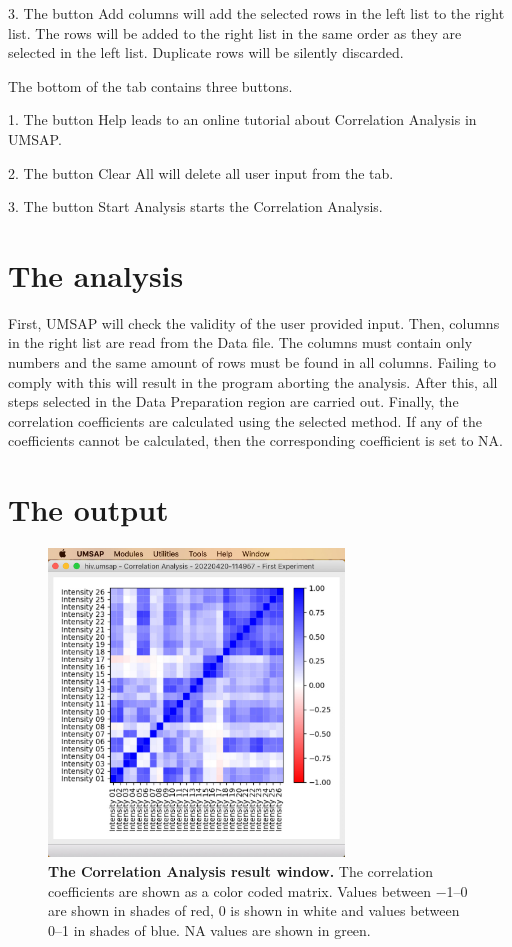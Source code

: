 \num{3}. The button Add columns will add the selected rows in the left list to
the right list. The rows will be added to the right list in the same order as
they are selected in the left list. Duplicate rows will be silently discarded.

The bottom of the tab contains three buttons.

\num{1}. The button Help leads to an online tutorial about Correlation Analysis in
UMSAP.

\num{2}. The button Clear All will delete all user input from the tab.

\num{3}. The button Start Analysis starts the Correlation Analysis.

\section{The analysis}

First, UMSAP will check the validity of the user provided input. Then, columns in
the right list are read from the Data file. The columns must contain only numbers
and the same amount of rows must be found in all columns. Failing to comply with
this will result in the program aborting the analysis. After this, all steps selected
in the Data Preparation region are carried out. Finally, the correlation coefficients
are calculated using the selected method. If any of the coefficients cannot be calculated,
then the corresponding coefficient is set to NA.

\section{The output}

\begin{figure}[h]
    \centering
    \includegraphics[width=0.7\textwidth]{./IMAGES/UTIL-CORR-WINDOW/util-corr-res.jpg}
    \caption[The Correlation Analysis result window]{\textbf{The Correlation Analysis
    result window.} The correlation coefficients are shown as a color coded matrix.
    Values between \numrange{-1}{0} are shown in shades of red, \num{0} is shown in
    white and values between \numrange{0}{1} in shades of blue. NA values are shown
    in green.}
    \label{fig:utilCorrAnalysisRes}
    \vspace{-5pt} 	
\end{figure} 

